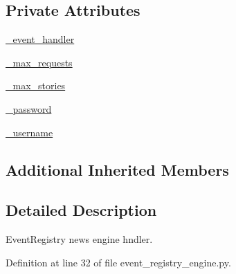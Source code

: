 \subsection*{Private Attributes}
\begin{DoxyCompactItemize}
\item 
\hyperlink{classrapp__news__explorer_1_1event__registry__engine_1_1EventRegistryEngine_ab274c792854dc175b2766d0a17f78b77}{\-\_\-event\-\_\-handler}
\item 
\hyperlink{classrapp__news__explorer_1_1event__registry__engine_1_1EventRegistryEngine_a2700763531ea563afbfcb169f42cf5e1}{\-\_\-max\-\_\-requests}
\item 
\hyperlink{classrapp__news__explorer_1_1event__registry__engine_1_1EventRegistryEngine_abc311f9906f7cc2a9ed5ee3fc6e13b5c}{\-\_\-max\-\_\-stories}
\item 
\hyperlink{classrapp__news__explorer_1_1event__registry__engine_1_1EventRegistryEngine_a6188aa88f78a9ff6840dcba0c63c19d2}{\-\_\-password}
\item 
\hyperlink{classrapp__news__explorer_1_1event__registry__engine_1_1EventRegistryEngine_a380d71c657027d3e1d573f5756c3b463}{\-\_\-username}
\end{DoxyCompactItemize}
\subsection*{Additional Inherited Members}


\subsection{Detailed Description}
Event\-Registry news engine hndler. 

Definition at line 32 of file event\-\_\-registry\-\_\-engine.\-py.



